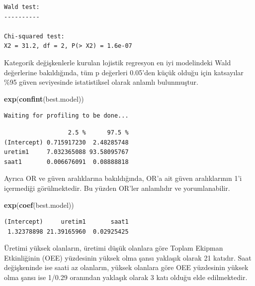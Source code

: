 \documentclass[12pt,twoside]{deuthesis}
\newenvironment{Shaded}{\begin{snugshade}}{\end{snugshade}}
\newcommand{\KeywordTok}[1]{\textcolor[rgb]{0.13,0.29,0.53}{\textbf{#1}}}
\newcommand{\NormalTok}[1]{#1}
\begin{document}
\begin{verbatim}
Wald test:
----------

Chi-squared test:
X2 = 31.2, df = 2, P(> X2) = 1.6e-07
\end{verbatim}
Kategorik değişkenlerle kurulan lojistik regresyon en iyi modelindeki Wald değerlerine bakıldığında, tüm p değerleri 0.05'den küçük olduğu için katsayılar \%95 güven seviyesinde istatistiksel olarak anlamlı bulunmuştur.
\begin{Shaded}
\begin{Highlighting}[]
\KeywordTok{exp}\NormalTok{(}\KeywordTok{confint}\NormalTok{(best.model))}
\end{Highlighting}
\end{Shaded}
\begin{verbatim}
Waiting for profiling to be done...
\end{verbatim}
\begin{verbatim}
                  2.5 %      97.5 %
(Intercept) 0.715917230  2.48285748
uretim1     7.032365088 93.58095767
saat1       0.006676091  0.08888818
\end{verbatim}
Ayrıca OR ve güven aralıklarına bakıldığında, OR'a ait güven aralıklarının 1'i içermediği görülmektedir. Bu yüzden OR'ler anlamlıdır ve yorumlanabilir.
\begin{Shaded}
\begin{Highlighting}[]
\KeywordTok{exp}\NormalTok{(}\KeywordTok{coef}\NormalTok{(best.model))}
\end{Highlighting}
\end{Shaded}
\begin{verbatim}
(Intercept)     uretim1       saat1 
 1.32378898 21.39165960  0.02925425 
\end{verbatim}
Üretimi yüksek olanların, üretimi düşük olanlara göre Toplam Ekipman Etkinliğinin (OEE) yüzdesinin yüksek olma şansı yaklaşık olarak 21 katıdır.
Saat değişkeninde ise saati az olanların, yüksek olanlara göre OEE yüzdesinin yüksek olma şansı ise 1/0.29 oranından yaklaşık olarak 3 katı olduğu elde edilmektedir.
\end{document}

